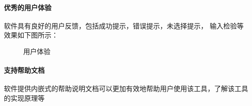 \documentclass[UTF8]{ctexart}
\begin{document}
        \paragraph{优秀的用户体验} 软件具有良好的用户反馈，包括成功提示，错误提示，未选择提示，
        输入检验等效果如下图所示：
        \begin{figure}[htb]
            \centering
            \hspace{2em}
            \hspace{2em}
            \caption{用户体验}
            \label{fig:trible}
        \end{figure}
        \paragraph{支持帮助文档} 软件提供内嵌式的帮助说明文档可以更加有效地帮助用户使用该工具，了解该工具的实现原理等
\end{document}
